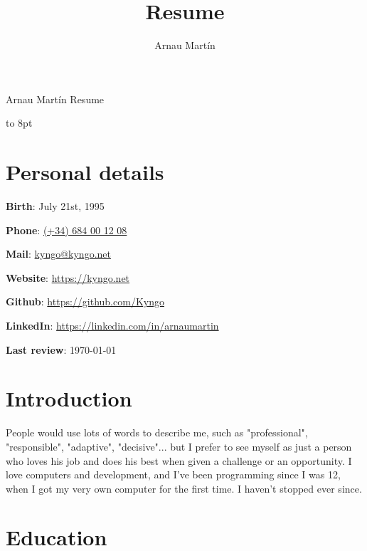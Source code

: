 \documentclass{article}
\author{Arnau Martín}
\title{Resume}
\begin{document}
\setlength{\parindent}{0cm} {
	{\Huge Arnau Martín} \textcolor{Bittersweet}{Resume}
	
	\vspace*{\dimexpr-\baselineskip-\topskip\relax}	
	\vbox to 8pt{\hfill{}}
	
	\section*{Personal details}
	
	\textbf{Birth}: July 21st, 1995

	\textbf{Phone}: \textcolor{Green}{\href{tel:+34684001208}{(+34) 684 00 12 08}}

	\textbf{Mail}: \textcolor{Green}{\href{mailto:kyngo@kyngo.net}{kyngo@kyngo.net}}
	
	\textbf{Website}: \textcolor{Green}{\href{https://kyngo.net}{https://kyngo.net}}
	
	\textbf{Github}: \textcolor{Green}{\href{https://github.com/Kyngo}{https://github.com/Kyngo}}
	
	\textbf{LinkedIn}: \textcolor{Green}{\href{https://linkedin.com/in/arnaumartin}{https://linkedin.com/in/arnaumartin}}

	\textbf{Last review}: \today

	\section*{Introduction}
	People would use lots of words to describe me,  such as "professional", "responsible", "adaptive", "decisive"...  
	but I prefer to see myself as just a person who loves his job and does his best when given a challenge or an opportunity. 
	I love computers and development, and I've been programming since I was 12, when I got my very own computer for the first time. 
	I haven't stopped ever since.
	
	\section*{Education}

}
\end{document}
